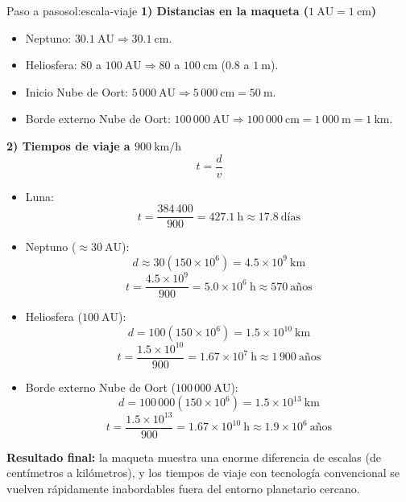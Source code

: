 \documentclass[12pt,oneside]{book}
\begin{document}
\begin{solucion}{Paso a paso}{sol:escala-viaje}
\textbf{1) Distancias en la maqueta (\(1\ \mathrm{AU}=1\ \mathrm{cm}\))}
\begin{itemize}[leftmargin=1.5em]
  \item Neptuno: \(30.1\ \mathrm{AU}\Rightarrow 30.1\ \mathrm{cm}\).
  \item Heliosfera: \(80\) a \(100\ \mathrm{AU}\Rightarrow 80\) a \(100\ \mathrm{cm}\) (\(0.8\) a \(1\ \mathrm{m}\)).
  \item Inicio Nube de Oort: \(5\,000\ \mathrm{AU}\Rightarrow 5\,000\ \mathrm{cm}=50\ \mathrm{m}\).
  \item Borde externo Nube de Oort: \(100\,000\ \mathrm{AU}\Rightarrow 100\,000\ \mathrm{cm}=1\,000\ \mathrm{m}=1\ \mathrm{km}\).
\end{itemize}

\textbf{2) Tiempos de viaje a \(900\ \mathrm{km/h}\)}
\[
t=\frac{d}{v}
\]
\begin{itemize}[leftmargin=1.5em]
  \item Luna:
  \[
  t=\frac{384\,400}{900}=427.1\ \mathrm{h}\approx 17.8\ \text{días}
  \]
  \item Neptuno (\(\approx 30\ \mathrm{AU}\)):
  \[
  d\approx 30(150\times10^6)=4.5\times10^9\ \mathrm{km}
  \]
  \[
  t=\frac{4.5\times10^9}{900}=5.0\times10^6\ \mathrm{h}\approx 570\ \text{años}
  \]
  \item Heliosfera (\(100\ \mathrm{AU}\)):
  \[
  d=100(150\times10^6)=1.5\times10^{10}\ \mathrm{km}
  \]
  \[
  t=\frac{1.5\times10^{10}}{900}=1.67\times10^7\ \mathrm{h}\approx 1\,900\ \text{años}
  \]
  \item Borde externo Nube de Oort (\(100\,000\ \mathrm{AU}\)):
  \[
  d=100\,000(150\times10^6)=1.5\times10^{13}\ \mathrm{km}
  \]
  \[
  t=\frac{1.5\times10^{13}}{900}=1.67\times10^{10}\ \mathrm{h}\approx 1.9\times10^6\ \text{años}
  \]
\end{itemize}

\textbf{Resultado final:} la maqueta muestra una enorme diferencia de escalas
(de centímetros a kilómetros), y los tiempos de viaje con tecnología convencional
se vuelven rápidamente inabordables fuera del entorno planetario cercano.
\end{solucion}

% 
% 
\end{document}
